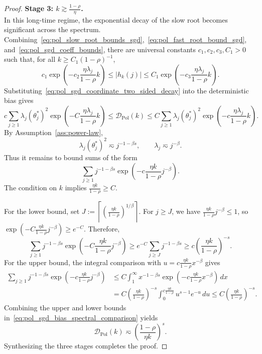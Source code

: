 \begin{proof}
\textbf{Stage 3: $k \gtrsim \frac{1-\rho}{\eta}$.} \\
In this long-time regime, the exponential decay of the slow root becomes significant across the spectrum. Combining~\eqref{eq:pol_slow_root_bounds_sgd},~\eqref{eq:pol_fast_root_bound_sgd}, and~\eqref{eq:pol_sgd_coeff_bounds}, there are universal constants $c_1,c_2,c_3,C_1>0$ such that, for all $k\ge C_1(1-\rho)^{-1}$,
\begin{equation}
\label{eq:pol_sgd_coordinate_two_sided_decay}
    c_1\exp\left(-c_2\frac{\eta\lambda_j}{1-\rho}k\right)
    \le
    |h_k(j)|
    \le
    C_1\exp\left(-c_3\frac{\eta\lambda_j}{1-\rho}k\right).
\end{equation}
Substituting~\eqref{eq:pol_sgd_coordinate_two_sided_decay} into the deterministic bias gives
\begin{equation}
\label{eq:pol_sgd_bias_spectral_comparison}
    c\sum_{j\ge1}\lambda_j(\theta_j^*)^2
    \exp\left(-C\frac{\eta\lambda_j}{1-\rho}k\right)
    \le
    \mathcal D_{\mathrm{Pol}}(k)
    \le
    C\sum_{j\ge1}\lambda_j(\theta_j^*)^2
    \exp\left(-c\frac{\eta\lambda_j}{1-\rho}k\right).
\end{equation}
By Assumption~\ref{ass:power-law},
\[
    \lambda_j(\theta_j^*)^2\eqsim j^{-1-\beta s}, \qquad \lambda_j\eqsim j^{-\beta}.
\]
Thus it remains to bound sums of the form
\[
    \sum_{j\ge1}j^{-1-\beta s}
    \exp\left(-c\frac{\eta k}{1-\rho}j^{-\beta}\right).
\]
The condition on $k$ implies $\frac{\eta k}{1-\rho}\ge C$.

For the lower bound, set $J:=\left\lceil \left(\frac{\eta k}{1-\rho}\right)^{1/\beta}\right\rceil$. For $j\ge J$, we have $\frac{\eta k}{1-\rho}j^{-\beta}\le1$, so $\exp(-C\frac{\eta k}{1-\rho}j^{-\beta})\ge e^{-C}$. Therefore,
\[
    \sum_{j\ge1}j^{-1-\beta s}\exp\left(-C\frac{\eta k}{1-\rho}j^{-\beta}\right)
    \ge
    e^{-C}\sum_{j\ge J}j^{-1-\beta s}
    \ge
    c\left(\frac{\eta k}{1-\rho}\right)^{-s}.
\]
For the upper bound, the integral comparison with $u=c\frac{\eta k}{1-\rho}x^{-\beta}$ gives
\begin{align*}
    \sum_{j\ge1}j^{-1-\beta s}\exp\left(-c\frac{\eta k}{1-\rho}j^{-\beta}\right)
    &\le
    C\int_1^\infty x^{-1-\beta s}\exp\left(-c\frac{\eta k}{1-\rho}x^{-\beta}\right)\,dx \\
    &=
    C \left(\frac{\eta k}{1-\rho}\right)^{-s}\int_0^{c\frac{\eta k}{1-\rho}}u^{s-1}e^{-u}\,du
    \le
    C \left(\frac{\eta k}{1-\rho}\right)^{-s}.
\end{align*}
Combining the upper and lower bounds in~\eqref{eq:pol_sgd_bias_spectral_comparison} yields
\[
    \mathcal D_{\mathrm{Pol}}(k)
    \eqsim
    \left(\frac{1-\rho}{\eta k}\right)^s.
\]
Synthesizing the three stages completes the proof.
\end{proof}

